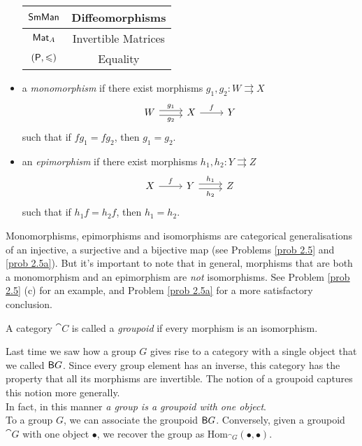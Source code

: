 \begin{definition}
\begin{itemize}[itemsep=1em]
\begin{example}
\begin{center}
{\begin{tabular}{|c|c|}
    \hline
    $\mathsf{SmMan}$ & Diffeomorphisms\\
    \hline
    $\mathsf{Mat}_A$ & Invertible Matrices\\
    \hline
    $(\mathsf{P},\leqslant)$ & Equality\\
    \hline
    \end{tabular}}
    \end{center}
\end{example}
\item a \emph{monomorphism} if there exist morphisms $g_1,g_2: W \rightrightarrows X$
\[\begin{tikzcd}
W \arrow[r, "g_1", shift left] \arrow[r, "g_2"', shift right] & X \arrow[r, "f"] & Y
\end{tikzcd}\]
such that if $fg_1 = fg_2$, then $g_1 = g_2$.
\item an \emph{epimorphism} if there exist morphisms $h_1,h_2: Y \rightrightarrows Z$
\[\begin{tikzcd}
X \arrow[r, "f"] & Y \arrow[r, "h_1", shift left] \arrow[r, "h_2"', shift right] & Z
\end{tikzcd}\]
such that if $h_1f = h_2f$, then $h_1 = h_2$.
\end{itemize}
\end{definition}

\vspace*{0.1in}

\begin{remark}
Monomorphisms, epimorphisms and isomorphisms are categorical generalisations of an injective, a surjective and a bijective map (see Problems \ref{prob 2.5} and \ref{prob 2.5a}). But it's important to note that in general, morphisms that are both a monomorphism and an epimorphism are \emph{not} isomorphisms. See Problem \ref{prob 2.5} (c) for an example, and Problem \ref{prob 2.5a} for a more satisfactory conclusion. 
\end{remark}

\vspace*{0.1in}

\begin{definition}
A category $\cat{C}$ is called a \emph{groupoid} if every morphism is an isomorphism.
\end{definition}

\vspace*{0.1in}

\begin{example}
Last time we saw how a group $G$ gives rise to a category with a single object that we called $\mathsf{B}G$. Since every group element has an inverse, this category has the property that all its morphisms are invertible. The notion of a groupoid captures this notion more generally.\\[1em]
In fact, in this manner \emph{a group is a groupoid with one object}.\\[0.5em]
To a group $G$, we can associate the groupoid $\mathsf{B}G$. Conversely, given a groupoid $\cat{G}$ with one object $\bullet$, we recover the group as $\mathrm{Hom}_{\cat{G}}(\bullet,\bullet)$.
\end{example}

